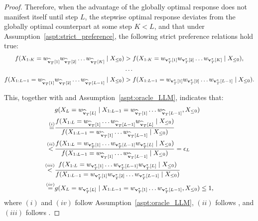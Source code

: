 \begin{proof}
    Therefore, when the advantage of the globally optimal response does not manifest itself until step $L$, the stepwise optimal response deviates from the globally optimal counterpart at some step $K < L$, and that under Assumption~\ref{aspt:strict_preference}, the following strict preference relations hold true:
    \begin{equation}\label{equ:before_manifest_strict}
        \small
        \begin{split}
            f(X_{1:K} = w_{\widehat{\mathbf{v}}_T[1]} w_{\widehat{\mathbf{v}}_T[2]} \ldots w_{\widehat{\mathbf{v}}_T[K]} \mid X_{\leq 0})
             & > f(X_{1:K} = w_{\mathbf{v}_T^*[1]} w_{\mathbf{v}_T^*[2]} \ldots w_{\mathbf{v}_T^*[K]} \mid X_{\leq 0}),         \\
             & \cdots                                                                                         \\
            f(X_{1:L - 1} = w_{\widehat{\mathbf{v}}_T[1]} w_{\widehat{\mathbf{v}}_T[2]} \ldots w_{\widehat{\mathbf{v}}_T[L - 1]} \mid X_{\leq 0})
             & > f(X_{1:L - 1} = w_{\mathbf{v}_T^*[1]} w_{\mathbf{v}_T^*[2]} \ldots w_{\mathbf{v}_T^*[L - 1]} \mid X_{\leq 0}).
        \end{split}
    \end{equation}

    This, together with  and Assumption~\ref{aspt:oracle_LLM}, indicates that:
    \begin{equation}
        \small
        \begin{split}
                               & g(X_L = w_{\widehat{\mathbf{v}}_T[L]} \mid X_{1:L-1} = w_{\widehat{\mathbf{v}}_T[1]} \ldots w_{\widehat{\mathbf{v}}_T[L - 1]}, X_{\leq 0})                                                                                            \\
            \overset{(i)}{=}   & \frac{f(X_{1:L} = w_{\widehat{\mathbf{v}}_T[1]} \ldots w_{\widehat{\mathbf{v}}_T[L - 1]} w_{\widehat{\mathbf{v}}_T[L]} \mid X_{\leq 0})}{f(X_{1:L - 1} = w_{\widehat{\mathbf{v}}_T[1]} \ldots w_{\widehat{\mathbf{v}}_T[L - 1]} \mid X_{\leq 0})} \\
            \overset{(ii)}{<}  & \frac{f(X_{1:L} = w_{\mathbf{v}_T^*[1]} \ldots w_{\mathbf{v}_T^*[L - 1]} w_{\mathbf{v}_T^*[L]} \mid X_{\leq 0})}{f(X_{1:L - 1} = w_{\widehat{\mathbf{v}}_T[1]} \ldots w_{\widehat{\mathbf{v}}_T[L - 1]} \mid X_{\leq 0})} = \epsilon_L            \\
            \overset{(iii)}{<} & \frac{f(X_{1:L} = w_{\mathbf{v}_T^*[1]} \ldots w_{\mathbf{v}_T^*[L - 1]} w_{\mathbf{v}_T^*[L]} \mid X_{\leq 0})}{f(X_{1:L - 1} = w_{\mathbf{v}_T^*[1]} w_{\mathbf{v}_T^*[2]} \ldots w_{\mathbf{v}_T^*[L - 1]} \mid X_{\leq 0})}                         \\
            \overset{(iv)}{=}  & g(X_L = w_{\mathbf{v}_T^*[L]} \mid X_{1:L-1} = w_{\mathbf{v}_T^*[1]} \ldots w_{\mathbf{v}_T^*[L - 1]}, X_{\leq 0}) \leq 1,
        \end{split}
    \end{equation}
    where $(i)$ and $(iv)$ follow Assumption~\ref{aspt:oracle_LLM}, $(ii)$ follows , and $(iii)$ follows .


\end{proof}

